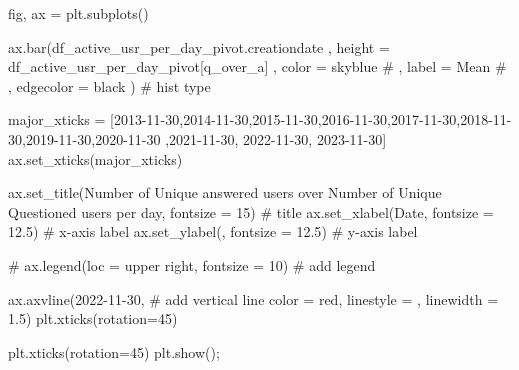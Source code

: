 \documentclass[
  letterpaper,
  DIV=11,
  numbers=noendperiod]{scrartcl}
\newenvironment{Shaded}{\begin{snugshade}}{\end{snugshade}}
\newcommand{\CommentTok}[1]{\textcolor[rgb]{0.37,0.37,0.37}{#1}}
\newcommand{\DecValTok}[1]{\textcolor[rgb]{0.68,0.00,0.00}{#1}}
\newcommand{\FloatTok}[1]{\textcolor[rgb]{0.68,0.00,0.00}{#1}}
\newcommand{\NormalTok}[1]{\textcolor[rgb]{0.00,0.23,0.31}{#1}}
\newcommand{\OperatorTok}[1]{\textcolor[rgb]{0.37,0.37,0.37}{#1}}
\newcommand{\StringTok}[1]{\textcolor[rgb]{0.13,0.47,0.30}{#1}}
\begin{document}
\begin{Shaded}
\begin{Highlighting}[]
\NormalTok{fig, ax }\OperatorTok{=}\NormalTok{ plt.subplots()}


\NormalTok{ax.bar(df\_active\_usr\_per\_day\_pivot.creationdate}
\NormalTok{    ,  height }\OperatorTok{=}\NormalTok{ df\_active\_usr\_per\_day\_pivot[}\StringTok{\textquotesingle{}q\_over\_a\textquotesingle{}}\NormalTok{]}
\NormalTok{    ,  color }\OperatorTok{=} \StringTok{\textquotesingle{}skyblue\textquotesingle{}}
    \CommentTok{\# ,  label = \textquotesingle{}Mean\textquotesingle{}}
    \CommentTok{\# ,  edgecolor = \textquotesingle{}black\textquotesingle{}}
\NormalTok{      ) }\CommentTok{\# hist type}


\NormalTok{major\_xticks }\OperatorTok{=}\NormalTok{ [}\StringTok{\textquotesingle{}2013{-}11{-}30\textquotesingle{}}\NormalTok{,}\StringTok{\textquotesingle{}2014{-}11{-}30\textquotesingle{}}\NormalTok{,}\StringTok{\textquotesingle{}2015{-}11{-}30\textquotesingle{}}\NormalTok{,}\StringTok{\textquotesingle{}2016{-}11{-}30\textquotesingle{}}\NormalTok{,}\StringTok{\textquotesingle{}2017{-}11{-}30\textquotesingle{}}\NormalTok{,}\StringTok{\textquotesingle{}2018{-}11{-}30\textquotesingle{}}\NormalTok{,}\StringTok{\textquotesingle{}2019{-}11{-}30\textquotesingle{}}\NormalTok{,}\StringTok{\textquotesingle{}2020{-}11{-}30\textquotesingle{}}
\NormalTok{                ,}\StringTok{\textquotesingle{}2021{-}11{-}30\textquotesingle{}}\NormalTok{, }\StringTok{\textquotesingle{}2022{-}11{-}30\textquotesingle{}}\NormalTok{, }\StringTok{\textquotesingle{}2023{-}11{-}30\textquotesingle{}}\NormalTok{]}
\NormalTok{ax.set\_xticks(major\_xticks)}

\NormalTok{ax.set\_title(}\StringTok{\textquotesingle{}Number of Unique answered users over Number of Unique Questioned users per day\textquotesingle{}}\NormalTok{, fontsize }\OperatorTok{=} \DecValTok{15}\NormalTok{) }\CommentTok{\# title}
\NormalTok{ax.set\_xlabel(}\StringTok{\textquotesingle{}Date\textquotesingle{}}\NormalTok{, fontsize }\OperatorTok{=} \FloatTok{12.5}\NormalTok{) }\CommentTok{\# x{-}axis label}
\NormalTok{ax.set\_ylabel(}\StringTok{\textquotesingle{}\textquotesingle{}}\NormalTok{, fontsize }\OperatorTok{=} \FloatTok{12.5}\NormalTok{) }\CommentTok{\# y{-}axis label}

\CommentTok{\# ax.legend(loc = \textquotesingle{}upper right\textquotesingle{}, fontsize = 10) \# add legend}

\NormalTok{ax.axvline(}\StringTok{\textquotesingle{}2022{-}11{-}30\textquotesingle{}}\NormalTok{, }\CommentTok{\# add vertical line}
\NormalTok{           color }\OperatorTok{=} \StringTok{\textquotesingle{}red\textquotesingle{}}\NormalTok{,}
\NormalTok{           linestyle }\OperatorTok{=} \StringTok{\textquotesingle{}{-}{-}\textquotesingle{}}\NormalTok{,}
\NormalTok{           linewidth }\OperatorTok{=} \FloatTok{1.5}\NormalTok{)}
\NormalTok{plt.xticks(rotation}\OperatorTok{=}\DecValTok{45}\NormalTok{)}

\NormalTok{plt.xticks(rotation}\OperatorTok{=}\DecValTok{45}\NormalTok{)}
\NormalTok{plt.show()}\OperatorTok{;}
\end{Highlighting}
\end{Shaded}
\end{document}
